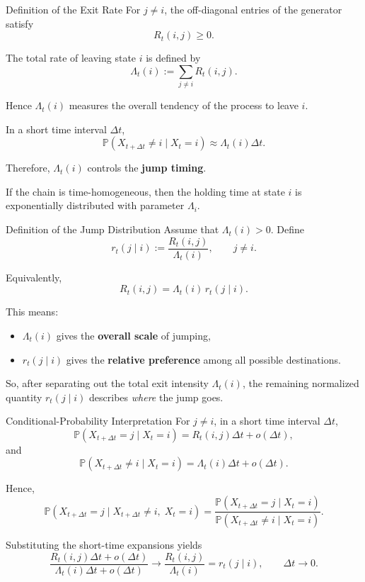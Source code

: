 \documentclass[aspectratio=169,professionalfonts]{beamer}
\newcommand{\Prob}{\mathbb{P}}
\begin{document}
\begin{frame}{Definition of the Exit Rate}
\small
For $j\neq i$, the off-diagonal entries of the generator satisfy
\[
R_t(i,j)\ge 0.
\]

The total rate of leaving state $i$ is defined by
\[
\Lambda_t(i):=\sum_{j\neq i}R_t(i,j).
\]

Hence $\Lambda_t(i)$ measures the overall tendency of the process to leave $i$.

\medskip
In a short time interval $\Delta t$,
\[
\Prob(X_{t+\Delta t}\neq i \mid X_t=i)
\approx
\Lambda_t(i)\Delta t.
\]

Therefore, $\Lambda_t(i)$ controls the \textbf{jump timing}.

\medskip
If the chain is time-homogeneous, then the holding time at state $i$ is exponentially distributed with parameter $\Lambda_i$.

\end{frame}

\begin{frame}{Definition of the Jump Distribution}
\small
Assume that $\Lambda_t(i)>0$. Define
\[
r_t(j\mid i):=\frac{R_t(i,j)}{\Lambda_t(i)}, \qquad j\neq i.
\]

Equivalently,
\[
R_t(i,j)=\Lambda_t(i)\,r_t(j\mid i).
\]

\medskip
This means:
\begin{itemize}
    \item $\Lambda_t(i)$ gives the \textbf{overall scale} of jumping,
    \item $r_t(j\mid i)$ gives the \textbf{relative preference} among all possible destinations.
\end{itemize}

So, after separating out the total exit intensity $\Lambda_t(i)$, the remaining normalized quantity $r_t(j\mid i)$ describes \emph{where} the jump goes.

\end{frame}

\begin{frame}{Conditional-Probability Interpretation}
\scriptsize
For $j\neq i$, in a short time interval $\Delta t$,
\[
\Prob(X_{t+\Delta t}=j\mid X_t=i)
=
R_t(i,j)\Delta t+o(\Delta t),
\]
and
\[
\Prob(X_{t+\Delta t}\neq i\mid X_t=i)
=
\Lambda_t(i)\Delta t+o(\Delta t).
\]

Hence,
\[
\Prob(X_{t+\Delta t}=j \mid X_{t+\Delta t}\neq i,\;X_t=i)
=
\frac{\Prob(X_{t+\Delta t}=j\mid X_t=i)}
{\Prob(X_{t+\Delta t}\neq i\mid X_t=i)}.
\]

Substituting the short-time expansions yields
\[
\frac{R_t(i,j)\Delta t+o(\Delta t)}
{\Lambda_t(i)\Delta t+o(\Delta t)}
\to
\frac{R_t(i,j)}{\Lambda_t(i)}
=
r_t(j\mid i),
\qquad \Delta t\to 0.
\]

\end{frame}
\end{document}
